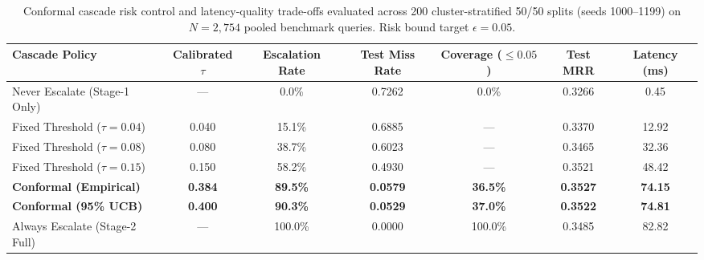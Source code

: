 \begin{table}[htbp]
\centering
\small
\caption{Conformal cascade risk control and latency-quality trade-offs evaluated across 200 cluster-stratified 50/50 splits (seeds 1000--1199) on $N=2{,}754$ pooled benchmark queries. Risk bound target $\epsilon = 0.05$.}
\label{tab:conformal_cascade_v2}
\begin{tabular}{lcccccc}
\toprule
Cascade Policy & Calibrated $\tau$ & Escalation Rate & Test Miss Rate & Coverage ($\le 0.05$) & Test MRR & Latency (ms) \\
\midrule
Never Escalate (Stage-1 Only) & --- & 0.0\% & 0.7262 & 0.0\% & 0.3266 & 0.45 \\
Fixed Threshold ($\tau=0.04$) & 0.040 & 15.1\% & 0.6885 & --- & 0.3370 & 12.92 \\
Fixed Threshold ($\tau=0.08$) & 0.080 & 38.7\% & 0.6023 & --- & 0.3465 & 32.36 \\
Fixed Threshold ($\tau=0.15$) & 0.150 & 58.2\% & 0.4930 & --- & 0.3521 & 48.42 \\
\textbf{Conformal (Empirical)} & \textbf{0.384} & \textbf{89.5\%} & \textbf{0.0579} & \textbf{36.5\%} & \textbf{0.3527} & \textbf{74.15} \\
\textbf{Conformal (95\% UCB)} & \textbf{0.400} & \textbf{90.3\%} & \textbf{0.0529} & \textbf{37.0\%} & \textbf{0.3522} & \textbf{74.81} \\
Always Escalate (Stage-2 Full) & --- & 100.0\% & 0.0000 & 100.0\% & 0.3485 & 82.82 \\
\bottomrule
\end{tabular}
\end{table}
